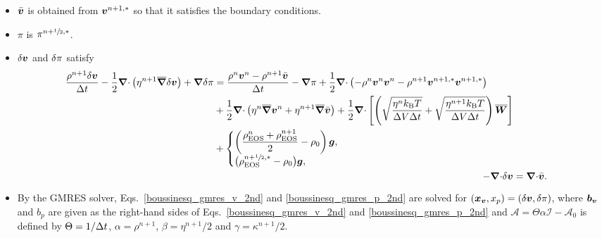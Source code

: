 \documentclass[
10pt
showpacs, showkeys,
amsmath,amssymb,
aps,
pre,
floatfix,
]{revtex4-1}
\newcommand{\divg}{{\V\nabla\cdot}}                       %
\begin{document}
\begin{enumerate}
\begin{itemize}
\item $\bar{\boldsymbol{v}}$ is obtained from $\boldsymbol{v}^{n+1,*}$ so that it satisfies the boundary conditions.
\item $\pi$ is $\pi^{n+\sfrac{1}{2},*}$.
\item $\delta\boldsymbol{v}$ and $\delta\pi$ satisfy
\begin{align}
\label{boussinesq_gmres_v_2nd}
\begin{split}
\frac{\rho^{n+1}\d{\V{v}}}{\D{t}} - \frac{1}{2}\divg\left(\eta^{n+1}\overline{\grad}\d{\V{v}}\right) + \grad\d{\pi}
& = \frac{\rho^n\V{v}^n-\rho^{n+1}\bar{\V{v}}}{\D{t}} - \grad\pi 
+ \frac{1}{2}\divg\left(-\rho^n\V{v}^n\V{v}^n-\rho^{n+1}\V{v}^{n+1,*}\V{v}^{n+1,*}\right) \\
& + \frac{1}{2}\divg\left( \eta^n\overline{\grad}\V{v}^n + \eta^{n+1}\overline{\grad}\bar{\V{v}} \right) 
+ \frac{1}{2}\divg\left[\left( \sqrt{\frac{\eta^n k_\mathrm{B}T}{\D{V}\D{t}}} + \sqrt{\frac{\eta^{n+1} k_\mathrm{B}T}{\D{V}\D{t}}} \right) \overline{\V{W}} \right] \\
& +
\begin{cases}
\displaystyle \left(\frac{\rho^n_\mathrm{EOS}+\rho^{n+1}_\mathrm{EOS}}{2}-\rho_0\right)\V{g}, \\
\big(\rho^{n+\myhalf,*}_\mathrm{EOS}-\rho_0\big)\V{g}, 
\end{cases}
\end{split} \\
\label{boussinesq_gmres_p_2nd}
-\divg\d{\V{v}} &= \divg\bar{\V{v}}.
\end{align}
\item By the GMRES solver, Eqs.~\eqref{boussinesq_gmres_v_2nd} and \eqref{boussinesq_gmres_p_2nd} are solved for $(\boldsymbol{x}_{\boldsymbol{v}},x_p)=(\delta\boldsymbol{v},\delta\pi)$, where $\boldsymbol{b}_{\boldsymbol{v}}$ and $b_p$ are given as the right-hand sides of Eqs.~\eqref{boussinesq_gmres_v_2nd} and \eqref{boussinesq_gmres_p_2nd} and $\mathcal{A}=\Theta\alpha\mathcal{I}-\mathcal{A}_0$ is defined by $\Theta=1/\Delta t$, $\alpha=\rho^{n+1}$, $\beta=\eta^{n+1}/2$ and $\gamma=\kappa^{n+1}/2$.
\end{itemize}

\end{enumerate}
\end{document}
